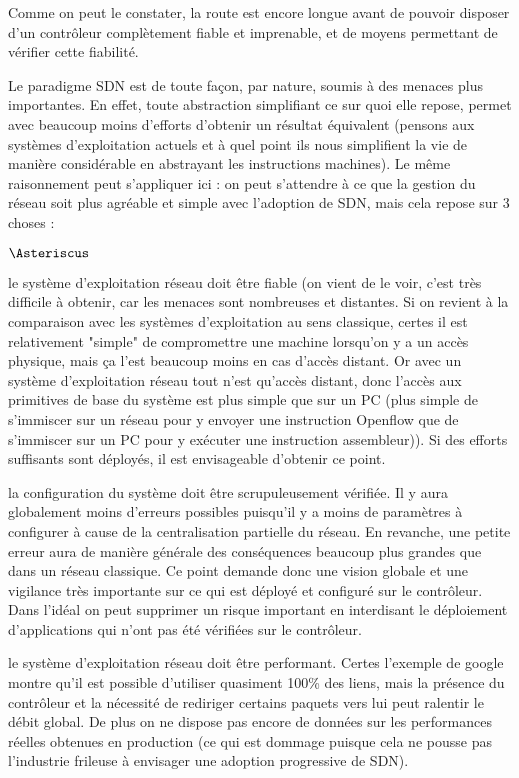 Comme on peut le constater, la route est encore longue avant de pouvoir disposer d'un contrôleur complètement fiable et imprenable, et de moyens permettant de vérifier cette fiabilité.

Le paradigme SDN est de toute façon, par nature, soumis à des menaces plus importantes. En effet, toute abstraction simplifiant ce sur quoi elle repose, permet avec beaucoup moins d'efforts d'obtenir un résultat équivalent (pensons aux systèmes d'exploitation actuels et à quel point ils nous simplifient la vie de manière considérable en abstrayant les instructions machines). Le même raisonnement peut s'appliquer ici : on peut s'attendre à ce que la gestion du réseau soit plus agréable et simple avec l'adoption de SDN, mais cela repose sur 3 choses :

\begin{list}{$\Asteriscus$}{}

\item le système d'exploitation réseau doit être fiable (on vient de le voir, c'est très difficile à obtenir, car les menaces sont nombreuses et distantes. Si on revient à la comparaison avec les systèmes d'exploitation au sens classique, certes il est relativement "simple" de compromettre une machine lorsqu'on y a un accès physique, mais ça l'est beaucoup moins en cas d'accès distant. Or avec un système d'exploitation réseau tout n'est qu'accès distant, donc l'accès aux primitives de base du système est plus simple que sur un PC (plus simple de s'immiscer sur un réseau pour y envoyer une instruction Openflow que de s'immiscer sur un PC pour y exécuter une instruction assembleur)). Si des efforts suffisants sont déployés, il est envisageable d'obtenir ce point.
\item la configuration du système doit être scrupuleusement vérifiée. Il y aura globalement moins d'erreurs possibles puisqu'il y a moins de paramètres à configurer à cause de la centralisation partielle du réseau. En revanche, une petite erreur aura de manière générale des conséquences beaucoup plus grandes que dans un réseau classique. Ce point demande donc une vision globale et une vigilance très importante sur ce qui est déployé et configuré sur le contrôleur. Dans l'idéal on peut supprimer un risque important en interdisant le déploiement d'applications qui n'ont pas été vérifiées sur le contrôleur.
\item le système d'exploitation réseau doit être performant. Certes l'exemple de google montre qu'il est possible d'utiliser quasiment 100\% des liens, mais la présence du contrôleur et la nécessité de rediriger certains paquets vers lui peut ralentir le débit global. De plus on ne dispose pas encore de données sur les performances réelles obtenues en production (ce qui est dommage puisque cela ne pousse pas l'industrie frileuse à envisager une adoption progressive de SDN).

\end{list}

